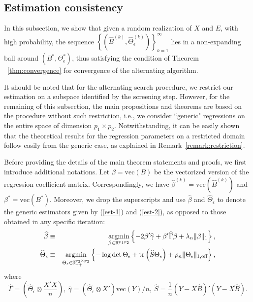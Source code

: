 \subsection{\normalsize Estimation consistency}\label{sec:consistency}

In this subsection, we show that given a random realization of $X$ and $E$, with high probability, the sequence $\left\{(\widehat{B}^{(k)},\widehat{\Theta}_\epsilon^{(k)})\right\}_{k=1}^\infty$ lies in a non-expanding ball around $(B^*,\Theta_\epsilon^*)$, thus satisfying the
condition of Theorem ~\ref{thm:convergence} for convergence of the alternating algorithm.

It should be noted that for the alternating search procedure, we restrict our estimation on a subspace identified by the screening step. However, for the remaining of this subsection, the main propositions and theorems are based on the procedure without such restriction, i.e., we consider ``generic" regressions on the entire space of dimension $p_1\times p_2$. Notwithstanding, it can be easily shown that the theoretical results for the regression
parameters on a restricted domain follow easily from the generic case, as explained in Remark~\ref{remark:restriction}.


Before providing the details of the main theorem statements and proofs, we first introduce additional notations. Let $\beta = \mathrm{vec}(B)$ be the vectorized version of the regression coefficient matrix. Correspondingly, we have $\widehat{\beta}^{(k)}=\mathrm{vec}(\widehat{B}^{(k)})$ and $\beta^* = \mathrm{vec}(B^*)$. Moreover, we drop the superscripts and use $\widehat{\beta}$ and $\widehat{\Theta}_\epsilon$ to denote the generic estimators given by (\ref{est-1}) and (\ref{est-2}), as opposed to those obtained in any specific iteration:
\begin{eqnarray}
\widehat{\beta} & \equiv & \mathop{\text{argmin}}\limits_{\beta\in\mathbb{R}^{p_1p_2}}\left\{ -2\beta'\widehat{\gamma} + \beta'\widehat{\Gamma}\beta + \lambda_n\|\beta\|_1\right\}, \label{est-1}\\
\widehat{\Theta}_\epsilon & \equiv & \mathop{\text{argmin}}\limits_{\Theta_\epsilon\in\mathbb{S}^{p_2\times p_2}_{++}} \left\{ -\log\det\Theta_\epsilon + \text{tr}\left( \widehat{S}\Theta_\epsilon\right) + \rho_n \|\Theta_\epsilon\|_{1,\text{off}}\right\}, \label{est-2}
\end{eqnarray}
where 
\begin{equation*}
\widehat{\Gamma} = \left(\widehat{\Theta}_\epsilon \otimes \frac{X'X}{n}\right), \ \widehat{\gamma} = \left(\widehat{\Theta}_\epsilon \otimes X' \right) \mathrm{vec}(Y)/n, \ \widehat{S} = \frac{1}{n}\left( Y - X\widehat{B}\right)'\left( Y - X\widehat{B}\right).
\end{equation*}

